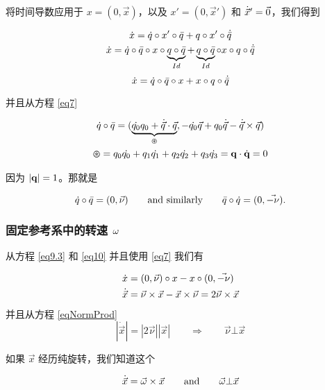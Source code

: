 将时间导数应用于 $x=(0,\vec{x})$，以及 $x'=(0,\vec{x}')$ 和 $\dot{\vec{x}}'=\vec{0}$，我们得到

\begin{gather*}
\dot{x} = \dot{q} \circ x' \circ \bar{q}  +  q \circ x' \circ \dot{\bar{q}}  \\
\dot{x} = \dot{q} \circ \bar{q} \circ x \circ \underbrace{q \circ \bar{q}}_{Id}  +  \underbrace{q \circ \bar{q}}_{Id} \circ x \circ q \circ \dot{\bar{q}}
\end{gather*}
\begin{equation}
\dot{x} = \dot{q} \circ \bar{q} \circ x  +   x \circ q \circ \dot{\bar{q}}  
\label{eq9.3}
\end{equation}

并且从方程 \eqref{eq7}

\begin{gather*}
\dot{q} \circ \bar{q} = ( \underbrace{\dot{q_0}q_0 + \dot{\vec{q}}\cdot\vec{q}}_{\varoast}, -\dot{q_0}\vec{q} + q_0\dot{\vec{q}} - \dot{\vec{q}} \times \vec{q}) \\
\varoast = q_0\dot{q_0} + q_1\dot{q_1} + q_2\dot{q_2} + q_3\dot{q_3} = \mathbf{q} \cdot \dot{\mathbf{q}} = 0
\end{gather*}

因为 $|\mathbf{q}|=1$。那就是

\begin{equation}
\dot{q} \circ \bar{q} = (0,\vec{\nu})  \qquad \textrm{and similarly} \qquad \bar{q} \circ \dot{q} = (0,\vec{-\nu}). 
\label{eq10}
\end{equation}


\subsubsection{固定参考系中的转速 $\omega$}
从方程 \eqref{eq9.3} 和 \eqref{eq10} 并且使用 \eqref{eq7} 我们有

\begin{align*}
\dot{x} & = (0,\vec{\nu}) \circ x - x \circ (0,\vec{-\nu})  \\
\dot{\vec{x}} & = \vec{\nu} \times \vec{x} - \vec{x} \times \vec{\nu} = 2 \vec{\nu} \times \vec{x}
\end{align*}
并且从方程 \eqref{eqNormProd} 
\begin{equation*}
|\dot{\vec{x}}|=|2\vec{\nu}||\vec{x}|  \qquad \Rightarrow \qquad    \vec{\nu} \bot \vec{x}
\end{equation*}


如果 $\vec{x}$ 经历纯旋转，我们知道这个

\begin{equation*}
\dot{\vec{x}} = \vec{\omega} \times \vec{x}    \qquad \textrm{and} \qquad   \vec{\omega} \bot \vec{x}
\end{equation*}

